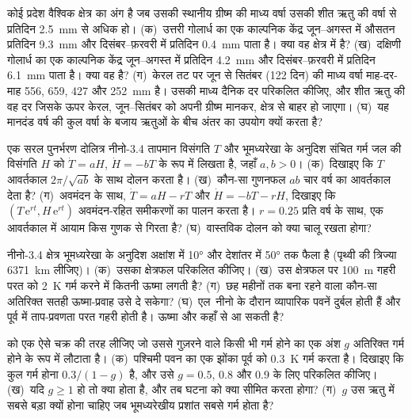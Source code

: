 \begin{exercise}[$\star\star$]\label{exo:b2:climate-variability:9}
कोई प्रदेश वैश्विक  क्षेत्र का अंग है जब उसकी स्थानीय ग्रीष्म की माध्य वर्षा उसकी शीत ऋतु की वर्षा से
प्रतिदिन \qty{2.5}{mm} से अधिक हो। (क)~उत्तरी गोलार्ध का एक काल्पनिक
केंद्र जून--अगस्त में औसतन प्रतिदिन \qty{9.3}{mm} और दिसंबर--फ़रवरी में प्रतिदिन \qty{0.4}{mm}
पाता है। क्या वह क्षेत्र में है? (ख)~दक्षिणी गोलार्ध का एक काल्पनिक केंद्र
जून--अगस्त में प्रतिदिन \qty{4.2}{mm} और दिसंबर--फ़रवरी में प्रतिदिन \qty{6.1}{mm} पाता है। क्या
वह है? (ग)~केरल तट पर जून से सितंबर (122 दिन) की माध्य वर्षा माह-दर-माह 556, 659, 427 और
\qty{252}{mm} है। उसकी माध्य दैनिक दर परिकलित कीजिए, और शीत ऋतु की वह दर जिसके ऊपर केरल,
जून--सितंबर को अपनी ग्रीष्म मानकर, क्षेत्र से बाहर हो जाएगा। (घ)~यह मानदंड वर्ष की कुल वर्षा के बजाय
ऋतुओं के बीच अंतर का उपयोग क्यों करता है?
\end{exercise}

\begin{exercise}[$\star\star\star$]\label{exo:b2:climate-variability:10}
एक सरल पुनर्भरण दोलित्र नीनो-3.4 तापमान विसंगति $T$ और भूमध्यरेखा के अनुदिश संचित
गर्म जल की विसंगति $H$ को $\dot T = aH$, $\dot H = -bT$ के रूप में लिखता है, जहाँ $a, b > 0$। (क)~दिखाइए
कि $T$ आवर्तकाल $2\pi/\sqrt{ab}$ के साथ दोलन करता है। (ख)~कौन-सा गुणनफल $ab$ चार वर्ष का
आवर्तकाल देता है? (ग)~अवमंदन के साथ, $\dot T = aH - rT$ और $\dot H = -bT - rH$, दिखाइए कि
$(T\,\mathrm{e}^{rt}, H\,\mathrm{e}^{rt})$ अवमंदन-रहित समीकरणों का पालन करता है। $r = 0.25$ प्रति
वर्ष के साथ, एक आवर्तकाल में आयाम किस गुणक से गिरता है? (घ)~वास्तविक
दोलन को क्या चालू रखता होगा?
\end{exercise}

\begin{exercise}[$\star\star\star$]\label{exo:b2:climate-variability:11}
नीनो-3.4 क्षेत्र भूमध्यरेखा के अनुदिश अक्षांश में \ang{10} और देशांतर में \ang{50} तक फैला है
(पृथ्वी की त्रिज्या \qty{6371}{km} लीजिए)। (क)~उसका क्षेत्रफल परिकलित कीजिए। (ख)~उस क्षेत्रफल पर \qty{100}{m}
गहरी परत को \qty{2}{K} गर्म करने में कितनी ऊष्मा लगती है? (ग)~छह महीनों तक बना रहने वाला कौन-सा अतिरिक्त
सतही ऊष्मा-प्रवाह उसे दे सकेगा? (घ)~एल~नीनो के दौरान व्यापारिक पवनें दुर्बल होती हैं और
पूर्व में ताप-प्रवणता परत गहरी होती है। ऊष्मा और कहाँ से आ सकती है?
\end{exercise}

\begin{exercise}[$\star\star\star$]\label{exo:b2:climate-variability:12}
 को एक ऐसे चक्र की तरह लीजिए जो उससे गुज़रने वाले किसी भी गर्म होने का एक अंश $g$
अतिरिक्त गर्म होने के रूप में लौटाता है। (क)~पश्चिमी पवन का एक झोंका पूर्व को \qty{0.3}{K} गर्म करता है। दिखाइए
कि कुल गर्म होना $0.3/(1 - g)$ है, और उसे $g = 0.5$, 0.8 और 0.9 के लिए परिकलित कीजिए। (ख)~यदि
$g \geq 1$ हो तो क्या होता है, और तब घटना को क्या सीमित करता होगा? (ग)~$g$ उस ऋतु में सबसे बड़ा क्यों होना
चाहिए जब भूमध्यरेखीय प्रशांत सबसे गर्म होता है?
\end{exercise}


